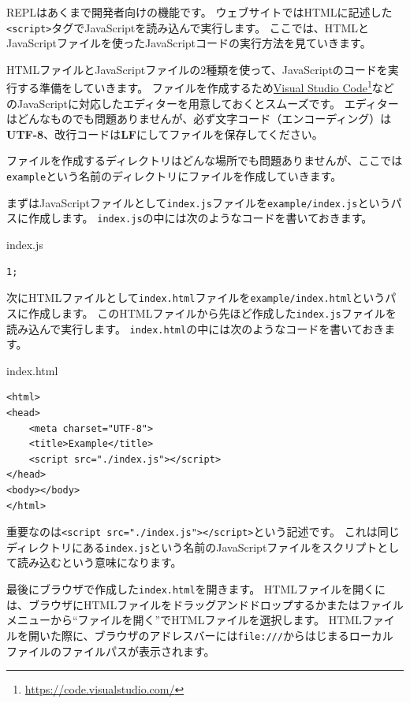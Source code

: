 REPLはあくまで開発者向けの機能です。
ウェブサイトではHTMLに記述した\texttt{<script>}タグでJavaScriptを読み込んで実行します。
ここでは、HTMLとJavaScriptファイルを使ったJavaScriptコードの実行方法を見ていきます。

HTMLファイルとJavaScriptファイルの2種類を使って、JavaScriptのコードを実行する準備をしていきます。
ファイルを作成するため\href{https://code.visualstudio.com/}{Visual
Studio
Code}\footnote{\url{https://code.visualstudio.com/}}などのJavaScriptに対応したエディターを用意しておくとスムーズです。
エディターはどんなものでも問題ありませんが、必ず文字コード（エンコーディング）は\textbf{UTF-8}、改行コードは\textbf{LF}にしてファイルを保存してください。

ファイルを作成するディレクトリはどんな場所でも問題ありませんが、ここでは\texttt{example}という名前のディレクトリにファイルを作成していきます。

まずはJavaScriptファイルとして\texttt{index.js}ファイルを\texttt{example/index.js}というパスに作成します。
\texttt{index.js}の中には次のようなコードを書いておきます。

\begin{listtitle}
index.js
\end{listtitle}
\begin{lstlisting}
1;
\end{lstlisting}
\listend

次にHTMLファイルとして\texttt{index.html}ファイルを\texttt{example/index.html}というパスに作成します。
このHTMLファイルから先ほど作成した\texttt{index.js}ファイルを読み込んで実行します。
\texttt{index.html}の中には次のようなコードを書いておきます。

\begin{listtitle}
index.html
\end{listtitle}
\begin{lstlisting}
<html>
<head>
    <meta charset="UTF-8">
    <title>Example</title>
    <script src="./index.js"></script>
</head>
<body></body>
</html>
\end{lstlisting}
\listend

重要なのは\texttt{<script src="./index.js"></script>}という記述です。
これは同じディレクトリにある\texttt{index.js}という名前のJavaScriptファイルをスクリプトとして読み込むという意味になります。

最後にブラウザで作成した\texttt{index.html}を開きます。
HTMLファイルを開くには、ブラウザにHTMLファイルをドラッグアンドドロップするかまたはファイルメニューから``ファイルを開く''でHTMLファイルを選択します。
HTMLファイルを開いた際に、ブラウザのアドレスバーには\texttt{file:///}からはじまるローカルファイルのファイルパスが表示されます。

